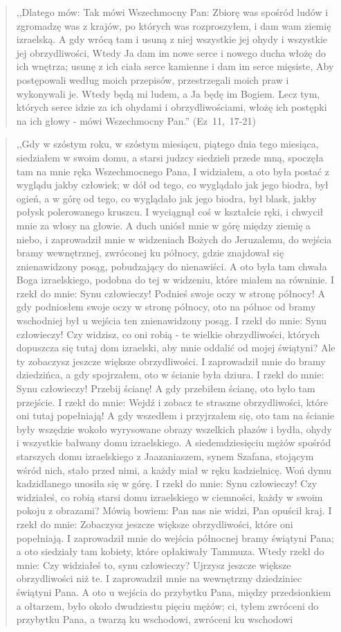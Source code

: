 \documentclass[10pt,a4paper,oneside]{article}
\begin{document}
\begin{quote}
,,Dlatego mów: Tak mówi Wszechmocny Pan: Zbiorę was spośród ludów i zgromadzę was z krajów, po których was rozproszyłem, i dam wam ziemię izraelską. A gdy wrócą tam i usuną z niej wszystkie jej ohydy i wszystkie jej obrzydliwości, Wtedy Ja dam im nowe serce i nowego ducha włożę do ich wnętrza; usunę z ich ciała serce kamienne i dam im serce mięsiste, Aby postępowali według moich przepisów, przestrzegali moich praw i wykonywali je. Wtedy będą mi ludem, a Ja będę im Bogiem. Lecz tym, których serce idzie za ich ohydami i obrzydliwościami, włożę ich postępki na ich głowy - mówi Wszechmocny Pan.'' \mbox{(Ez 11, 17-21)}
\end{quote}
\begin{quote}
,,Gdy w szóstym roku, w szóstym miesiącu, piątego dnia tego miesiąca, siedziałem w swoim domu, a starsi judzcy siedzieli przede mną, spoczęła tam na mnie ręka Wszechmocnego Pana, I widziałem, a oto była postać z wyglądu jakby człowiek; w dół od tego, co wyglądało jak jego biodra, był ogień, a w górę od tego, co wyglądało jak jego biodra, był blask, jakby połysk polerowanego kruszcu. I wyciągnął coś w kształcie ręki, i chwycił mnie za włosy na głowie. A duch uniósł mnie w górę między ziemię a niebo, i zaprowadził mnie w widzeniach Bożych do Jeruzalemu, do wejścia bramy wewnętrznej, zwróconej ku północy, gdzie znajdował się znienawidzony posąg, pobudzający do nienawiści. A oto była tam chwała Boga izraelskiego, podobna do tej w widzeniu, które miałem na równinie. I rzekł do mnie: Synu człowieczy! Podnieś swoje oczy w stronę północy! A gdy podniosłem swoje oczy w stronę północy, oto na północ od bramy wschodniej był u wejścia ten znienawidzony posąg. I rzekł do mnie: Synu człowieczy! Czy widzisz, co oni robią - te wielkie obrzydliwości, których dopuszcza się tutaj dom izraelski, aby mnie oddalić od mojej świątyni? Ale ty zobaczysz jeszcze większe obrzydliwości. I zaprowadził mnie do bramy dziedzińca, a gdy spojrzałem, oto w ścianie była dziura. I rzekł do mnie: Synu człowieczy! Przebij ścianę! A gdy przebiłem ścianę, oto było tam przejście. I rzekł do mnie: Wejdź i zobacz te straszne obrzydliwości, które oni tutaj popełniają! A gdy wszedłem i przyjrzałem się, oto tam na ścianie były wszędzie wokoło wyrysowane obrazy wszelkich płazów i bydła, ohydy i wszystkie bałwany domu izraelskiego. A siedemdziesięciu mężów spośród starszych domu izraelskiego z Jaazaniaszem, synem Szafana, stojącym wśród nich, stało przed nimi, a każdy miał w ręku kadzielnicę. Woń dymu kadzidlanego unosiła się w górę. I rzekł do mnie: Synu człowieczy! Czy widziałeś, co robią starsi domu izraelskiego w ciemności, każdy w swoim pokoju z obrazami? Mówią bowiem: Pan nas nie widzi, Pan opuścił kraj. I rzekł do mnie: Zobaczysz jeszcze większe obrzydliwości, które oni popełniają. I zaprowadził mnie do wejścia północnej bramy świątyni Pana; a oto siedziały tam kobiety, które opłakiwały Tammuza. Wtedy rzekł do mnie: Czy widziałeś to, synu człowieczy? Ujrzysz jeszcze większe obrzydliwości niż te. I zaprowadził mnie na wewnętrzny dziedziniec świątyni Pana. A oto u wejścia do przybytku Pana, między przedsionkiem a ołtarzem, było około dwudziestu pięciu mężów; ci, tyłem zwróceni do przybytku Pana, a twarzą ku wschodowi, zwróceni ku wschodowi 
\end{quote}
\end{document}
